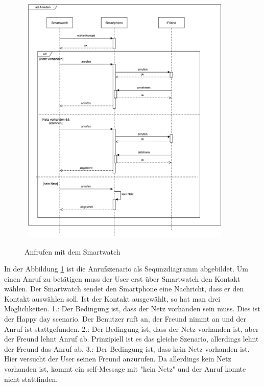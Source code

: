 \begin{figure}[H]
\centering\
\includegraphics[width=10cm]{img/AnrufenSequenz}
\caption{Anfrufen mit dem Smartwatch}\label{fig:anruf}
\end{figure}

In der Abbildung \ref{fig:anruf} ist die Anrufszenario als Sequnzdiagramm abgebildet. 
Um einen Anruf zu betätigen muss der User erst über Smartwatch den Kontakt wählen. Der Smartwatch sendet den Smartphone eine Nachricht, dass er den Kontakt auswählen soll. Ist der Kontakt ausgewählt, so hat man drei Möglichkeiten.
1.: Der Bedingung ist, dass der Netz vorhanden sein muss. Dies ist der Happy day scenario. Der Benutzer ruft an, der Freund nimmt an und der Anruf ist stattgefunden.
2.: Der Bedingung ist, dass der Netz vorhanden ist, aber der Freund lehnt Anruf ab. Prinzipiell ist es das gleiche Szenario, allerdings lehnt der Freund das Anruf ab.
3.: Der Bedingung ist, dass kein Netz vorhanden ist. Hier versucht der User seinen Freund anzurufen. Da allerdings kein Netz vorhanden ist, kommt ein self-Message mit "kein Netz" und der Anruf konnte nicht stattfinden.





